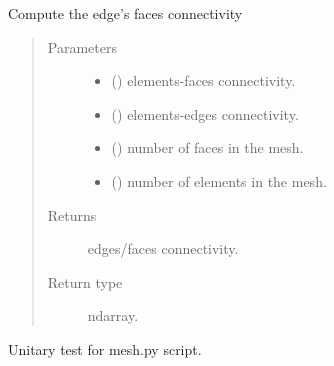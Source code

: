 \documentclass[letterpaper,10pt,english]{sphinxmanual}
\begin{document}
\begin{fulllineitems}
\label{\detokenize{petgem/mesh:petgem.mesh.computeFacesEdges}}
Compute the edge’s faces connectivity
\begin{quote}\begin{description}
\item[{Parameters}] \leavevmode\begin{itemize}
\item {} 
 () \textendash{} elements-faces connectivity.

\item {} 
 () \textendash{} elements-edges connectivity.

\item {} 
 () \textendash{} number of faces in the mesh.

\item {} 
 () \textendash{} number of elements in the mesh.

\end{itemize}

\item[{Returns}] \leavevmode
edges/faces connectivity.

\item[{Return type}] \leavevmode
ndarray.

\end{description}\end{quote}

\end{fulllineitems}


\begin{fulllineitems}
\label{\detokenize{petgem/mesh:petgem.mesh.unitary_test}}
Unitary test for mesh.py script.

\end{fulllineitems}
\end{document}
